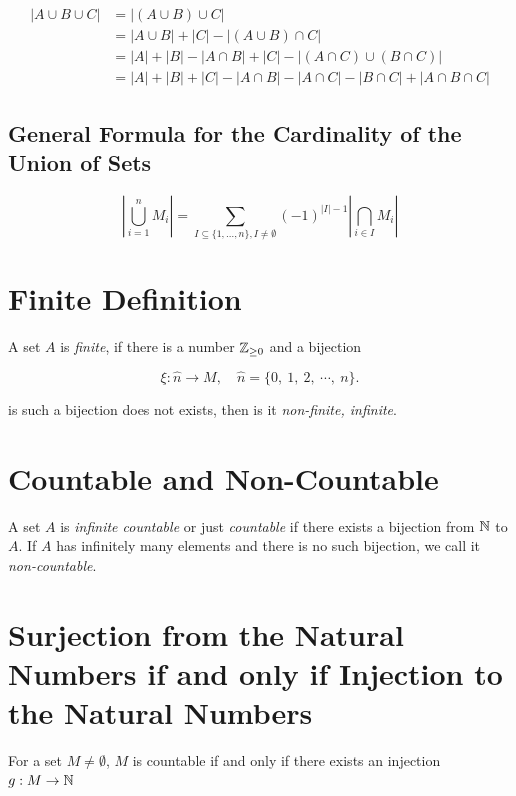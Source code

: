 \begin{align*}
	|A \cup B \cup C| & = |(A \cup B) \cup C|                                                        \\
	                  & = |A \cup B| + |C| - |(A \cup B) \cap C|                                     \\
	                  & = |A| + |B| - |A \cap B| + |C| - |(A \cap C) \cup (B \cap C)|                \\
	                  & = |A| + |B| + |C| - |A \cap B| - |A \cap C| - |B \cap C| + |A \cap B \cap C|
\end{align*}

\subsection{General Formula for the Cardinality of the Union of Sets}

\[
	\left\vert \bigcup_{i = 1}^n M_i \right\vert  = \sum_{I \subseteq \{1, \dots, n\}, I \neq \emptyset}
	{(-1)}^{|I| - 1} \left\vert \bigcap_{i \in I} M_i \right\vert
\]

\section{Finite Definition}

A set \(A\) is \emph{finite}, if there is a number \(\mathbb{Z}_{\ge 0}\) and a bijection

\[
	\xi: \hat{n} \to M, \quad \hat{n} = \{0, \ 1, \ 2, \ \cdots, \ n\}.
\]

is such a bijection does not exists, then is it \emph{non-finite, infinite}.

\section{Countable and Non-Countable}

A set \(A\) is \emph{infinite countable} or just \emph{countable} if there exists a bijection from \(\mathbb{N}\) to
\(A\). If \(A\) has infinitely many elements and there is no such bijection, we call it \emph{non-countable}.

\section{Surjection from the Natural Numbers if and only if Injection to the Natural Numbers}

For a set \(M \neq \emptyset\), \(M\) is countable if and only if there exists an injection \(g: M \to \mathbb{N}\)

